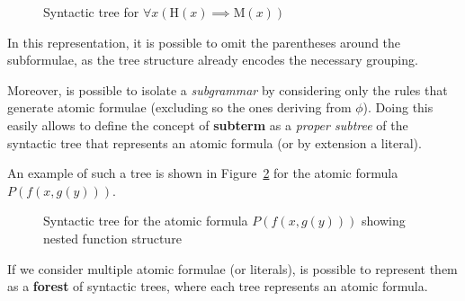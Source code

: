 \begin{figure}[H]
    \centering
    \caption{Syntactic tree for \(\forall x (\text{H}(x) \implies \text{M}(x))\)}\label{fig:syntactic_tree}
\end{figure}

In this representation, it is possible to omit the parentheses around the subformulae, as the tree structure already encodes the necessary grouping.

Moreover, is possible to isolate a \emph{subgrammar} by considering only the rules that generate atomic formulae (excluding so the ones deriving from \(\phi\)). Doing this easily allows to define the concept of \textbf{subterm} as a \emph{proper subtree} of the syntactic tree that represents an atomic formula (or by extension a literal).

An example of such a tree is shown in Figure~\ref{fig:subterm_tree} for the atomic formula \(P(f(x, g(y)))\).
\begin{figure}[H]
    \centering
    \caption{Syntactic tree for the atomic formula \(P(f(x, g(y)))\) showing nested function structure}\label{fig:subterm_tree}
\end{figure}

If we consider multiple atomic formulae (or literals), is possible to represent them as a \textbf{forest} of syntactic trees, where each tree represents an atomic formula.

